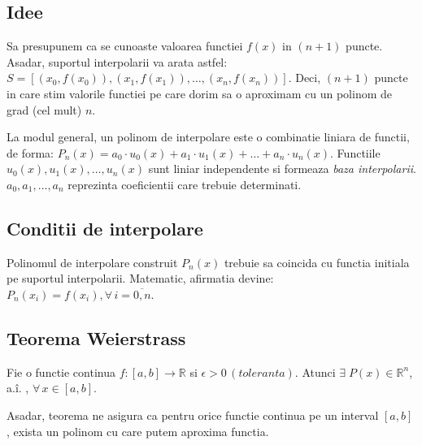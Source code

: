 \documentclass{article}
\begin{document}
\subsection{Idee}
\tab Sa presupunem ca se cunoaste valoarea functiei $f(x)$ in $(n+1)$ puncte.
Asadar, suportul interpolarii va arata astfel: $S=[(x_0, f(x_0)), (x_1, f(x_1)),\dots,(x_n, f(x_n))]$.
Deci, $(n+1)$ puncte in care stim valorile functiei pe care dorim sa o aproximam cu un polinom de grad (cel mult) $n$.

La modul general, un polinom de interpolare este o combinatie liniara de functii, de forma: $P_n(x)= a_0\cdot u_0(x) + a_1\cdot u_1(x) + \dots + a_n\cdot u_n(x)$. Functiile $u_0(x), u_1(x), \dots, u_n(x)$ sunt liniar independente si formeaza \textit{baza interpolarii}. $a_0, a_1, \dots, a_n$ reprezinta coeficientii care trebuie determinati.

\subsection{Conditii de interpolare}
\tab Polinomul de interpolare construit $P_n(x)$ trebuie sa coincida cu functia initiala pe suportul interpolarii. Matematic, afirmatia devine: $P_n(x_i) = f(x_i), \forall \, i = \overline{0, n}$.

\subsection{Teorema Weierstrass}
\tab Fie o functie continua $f:[a,b]\rightarrow\mathbb{R}$ si $\epsilon > 0 \, (toleranta)$. Atunci $\exists\; P(x) \in \mathbb{R}^{n}$, a.\^{i}. , $\forall \, x \in [a, b]$.

Asadar, teorema ne asigura ca pentru orice functie continua pe un interval $[a,b]$, exista un polinom cu care putem aproxima functia.\\
\end{document}
